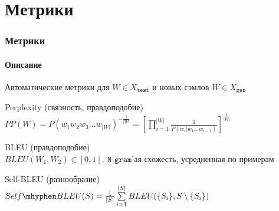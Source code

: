 \documentclass[10pt]{beamer}
\newcommand{\X}[1]{X_{\texttt{#1}}}
\newcommand{\Xtest}{\X{test}}
\newcommand{\Xgen}{\X{gen}}
\begin{document}
\section{Метрики}
\begin{frame}
\frametitle{Метрики}
\framesubtitle{Описание}


Автоматические метрики для $W \in \Xtest$ и новых сэмлов $W \in \Xgen$
\begin{block}{Perplexity (связность, правдоподобие)}
    $PP(W) = P(w_1w_2w_3\dots w_{|W|})^{-\frac{1}{|W|}} = \left[\prod\limits_{i=1}^{|W|}{\frac{1}{P(w_i|w_1\dots w_{i-1})}}\right]^{\frac{1}{|W|}}$
\end{block}
\begin{block}{BLEU (правдоподобие)}
    $BLEU(W_1, W_2) \in [0, 1], ~ \texttt{N-gram'ая схожесть, усредненная по примерам}$
\end{block}
\begin{block}{Self-BLEU (разнообразие)}
    $Self \mhyphen BLEU(S) = \frac{1}{|S|} \sum\limits^{|S|}_{i=1}{BLEU(\{S_i\}, S \setminus \{S_i\})}$
\end{block}

\end{frame}
\end{document}
